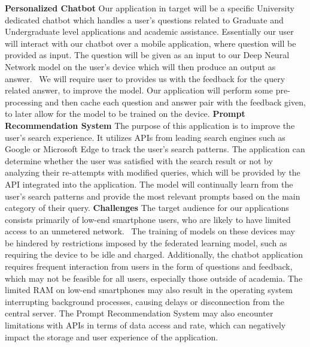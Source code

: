         \textbf{Personalized Chatbot}
        Our application in target will be a specific University dedicated chatbot which handles a user's questions related to Graduate and Undergraduate level applications and academic assistance. Essentially our user will interact with our chatbot over a mobile application, where question will be provided as input. The question will be given as an input to our Deep Neural Network model on the user's device which will then produce an output as answer.~\cite{9225395} We will require user to provides us with the feedback for the query related answer, to improve the model. Our application will perform some pre-processing and then cache each question and answer pair with the feedback given, to later allow for the model to be trained on the device.\newline \newline
        \textbf{Prompt Recommendation System}
        The purpose of this application is to improve the user's search experience. It utilizes 
        APIs from leading search engines such as Google or Microsoft Edge to track the user's 
        search patterns. The application can determine whether the user was satisfied with the 
        search result or not by analyzing their re-attempts with modified queries, which will be 
        provided by the API integrated into the application. The model will continually learn from 
        the user's search patterns and provide the most relevant prompts based on the main 
        category of their query. \newline \newline
        \textbf{Challenges}
        The target audience for our applications consists primarily of low-end smartphone 
        users, who are likely to have limited access to an unmetered network.~\cite{10.1504/IJMC.2005.006583} The training 
        of models on these devices may be hindered by restrictions imposed by the federated 
        learning model, such as requiring the device to be idle and charged. Additionally, the 
        chatbot application requires frequent interaction from users in the form of questions and 
        feedback, which may not be feasible for all users, especially those outside of academia. 
        The limited RAM on low-end smartphones may also result in the operating system 
        interrupting background processes, causing delays or disconnection from the central 
        server. The Prompt Recommendation System may also encounter limitations with APIs 
        in terms of data access and rate, which can negatively impact the storage and user 
        experience of the application.
    
